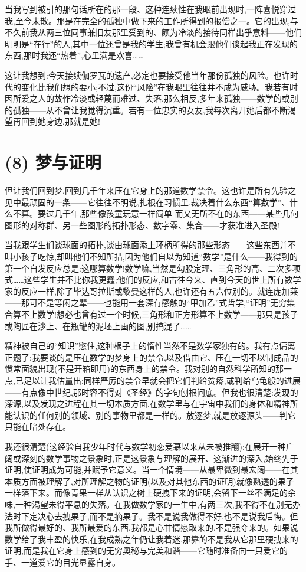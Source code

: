 当我写到被引的那句话所在的那一段、这种连续性在我眼前出现时,一阵喜悦穿过我,至今未散。那是在完全的孤独中做下来的工作所得到的报偿之一。它的出现,与不久前我从两三位同事兼旧友那里受到的、颇为冷淡的接待同样出乎意料——他们明明是“在行”的人,其中一位还曾是我的学生;我曾有机会跟他们谈起我正在发现的东西,那时我还“热着”,心里满是欢喜……

这让我想到:今天接续伽罗瓦的遗产,必定也要接受他当年那份孤独的风险。也许时代的变化比我们想的要小;不过,这份“风险”在我眼里往往并不成为威胁。我若有时因所爱之人的故作冷淡或轻蔑而难过、失落,那么相反,多年来孤独——数学的或别的孤独——从不曾让我觉得沉重。若有一位忠实的女友,我每次离开她后都不断渴望再回到她身边,那就是她!

\section{(8) 梦与证明}

但让我们回到梦,回到几千年来压在它身上的那道数学禁令。这也许是所有先验之见中最顽固的一条——它往往不明说,扎根在习惯里,裁决着什么东西“算数学”、什么不算。要过几千年,那些像孩童玩意一样简单
而又无所不在的东西——某些几何图形的对称群、另一些图形的拓扑形态、数字零、集合——才获准进入圣殿!

 当我跟学生们谈球面的拓扑,谈由球面添上环柄所得的那些形态——这些东西并不叫小孩子吃惊,却叫他们不知所措,因为他们自以为知道“数学”是什么——我得到的第一个自发反应总是:这哪算数学!数学嘛,当然是勾股定理、三角形的高、二次多项式……这些学生并不比你我更蠢;他们的反应,和古往今来、直到今天的世上所有数学家的反应一样,除了毕达哥拉斯或黎曼这样的人,也许还有五六位别的。就连庞加莱——那可不是等闲之辈——也能用一套深有感触的“甲加乙”式哲学,“证明”无穷集合算不上数学!想必也曾有过一个时候,三角形和正方形算不上数学——那只是孩子或陶匠在沙上、在瓶罐的泥坯上画的图,别搞混了……

精神被自己的“知识”憋住,这种根子上的惰性当然不是数学家独有的。我有点偏离正题了:我要谈的是压在数学的梦身上的禁令,以及借由它、压在一切不以制成品的惯常面貌出现(不是开箱即用)的东西身上的禁令。我对别的自然科学所知的那一点,已足以让我估量出:同样严厉的禁令早就会把它们判给贫瘠,或判给乌龟般的进展——有点像中世纪,那时容不得对《圣经》的字句刨根问底。但我也很清楚:发现的深源,以及发现之进程在其一切本质方面,在数学里与在宇宙中我们的身体和精神所能认识的任何别的领域、别的事物里都是一样的。放逐梦,就是放逐源头——判它只能在暗处存在。

我还很清楚(这经验自我少年时代与数学初恋爱慕以来从未被推翻):在展开一种广阔或深刻的数学事物之景象时,正是这景象与理解的展开、这渐进的深入,始终先于证明,使证明成为可能,并赋予它意义。当一个情境——从最卑微到最宏阔——在其本质方面被理解了,对所理解之物的证明(以及对其他东西的证明)就像熟透的果子一样落下来。而像青果一样从认识之树上硬拽下来的证明,会留下一丝不满足的余味,一种渴望未得平息的失落。在我做数学家的一生中,有两三次,我不得不在别无办法时下定决心去拽果子,而不是摘果子。我不是说我做得不好,也不是说我后悔。但我所做得最好的、我所最爱的东西,我都是心甘情愿取来的,不是强夺来的。如果说数学给了我丰盈的快乐,在我成熟之年仍让我着迷,那靠的不是我从它那里硬拽来的证明,而是我在它身上感到的无穷奥秘与完美和谐——它随时准备向一只爱它的手、一道爱它的目光显露自身。

